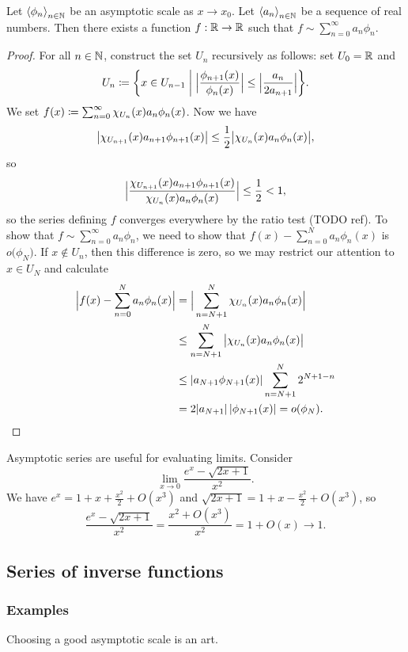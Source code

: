 \begin{proposition}
Let $\left\langle \phi_n \right\rangle_{n\in \mathbb{N}}$ be an asymptotic scale as $x\to x_0$. Let $\left\langle a_n \right\rangle_{n\in \mathbb{N}}$ be a sequence of real numbers. Then there exists a function $f: \mathbb{R}\to\mathbb{R}$ such that $f \sim \sum_{n=0}^\infty a_n\phi_n$.
\end{proposition}
\begin{proof}
For all $n\in \mathbb{N}$, construct the set $U_n$ recursively as follows: set $U_0 = \mathbb{R}$ and
\[ U_{n} \defeq \setbuilder{x\in U_{n-1}}{\Big|\frac{\phi_{n+1}(x)}{\phi_{n}(x)}\Big|\leq \Big|\frac{a_n}{2a_{n+1}}\Big|}. \]
We set $f(x) \coloneqq \sum_{n=0}^\infty \chi_{U_n}(x)a_n\phi_n(x)$. Now we have
\[  \big|\chi_{U_{n+1}}(x)a_{n+1}\phi_{n+1}(x)\big| \leq \frac{1}{2}\big|\chi_{U_{n}}(x)a_{n}\phi_{n}(x)\big|, \]
so
\[ \Big|\frac{\chi_{U_{n+1}}(x)a_{n+1}\phi_{n+1}(x)}{\chi_{U_{n}}(x)a_{n}\phi_{n}(x)}\Big| \leq \frac{1}{2} < 1, \]
so the series defining $f$ converges everywhere by the ratio test (TODO ref). To show that $f \sim \sum_{n=0}^\infty a_n\phi_n$, we need to show that $f(x) - \sum_{n=0}^N a_n\phi_n(x)$ is $o\big(\phi_{N}\big)$. If $x\notin U_n$, then this difference is zero, so we may restrict our attention to $x\in U_{N}$ and calculate
\begin{align*}
\Big|f(x) - \sum_{n=0}^N a_n\phi_n(x)\Big| &= \Big|\sum_{n=N+1}^N \chi_{U_{n}}(x)a_n\phi_n(x)\Big| \\
&\leq \sum_{n=N+1}^N \big|\chi_{U_{n}}(x)a_n\phi_n(x)\big| \\
&\leq |a_{N+1}\phi_{N+1}(x)|\sum_{n=N+1}^N 2^{N+1-n} \\
&= 2|a_{N+1}|\,|\phi_{N+1}(x)| = o(\phi_{N}).
\end{align*}
\end{proof}

\begin{example}
Asymptotic series are useful for evaluating limits. Consider
\[ \lim_{x\to 0} \frac{e^x - \sqrt{2x+1}}{x^2}. \]
We have $e^x = 1 + x + \frac{x^2}{2} + O(x^3)$ and $\sqrt{2x+1} = 1 + x - \frac{x^2}{2} + O(x^3)$, so
\[ \frac{e^x - \sqrt{2x+1}}{x^2} = \frac{x^2 + O(x^3)}{x^2} = 1 + O(x) \to 1. \]
\end{example}

\subsection{Series of inverse functions}
\subsubsection{Examples}
Choosing a good asymptotic scale is an art.

